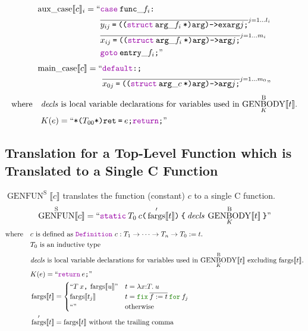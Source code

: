 \documentclass[a4paper,fleqn]{article}
\newcommand{\kwDefinition}{\mbox{\color{myviolet}\ttfamily Definition}}
\newcommand{\kwfix}{\mbox{\color{mygreen}\ttfamily fix}}
\newcommand{\kwfor}{\mbox{\color{mygreen}\ttfamily for}}
\newcommand{\lamT}[3]{\lambda #1\mathord{:}#2.\:#3}
\newcommand{\ofix}[2]{\kwfix\:{#1}\:\kwfor\:{#2}}
\newcommand{\BRA}[1]{\llbracket #1 \rrbracket}
\DeclareMathOperator{\genbody}{GENBODY}
\newcommand{\genbodyb}[2]{\genbody^\mathrm{B}_{#1}\BRA{#2}}
\DeclareMathOperator{\genfunop}{GENFUN}
\newcommand{\genfuns}[1]{\genfunop^\mathrm{S}\BRA{#1}}
\newcommand{\auxcase}[2]{\mathrm{aux\_case}\BRA{#1}_{#2}}
\newcommand{\maincase}[1]{\mathrm{main\_case}\BRA{#1}}
\newcommand{\ldq}{\text{``}}
\newcommand{\rdq}{\text{''}}
\newcommand{\dq}[1]{\text{``}#1\text{''}}
\newcommand{\ttparen}[1]{\texttt{(}#1\texttt{)}}
\newcommand{\ttlbrace}{\texttt{\char '173}}
\newcommand{\ttrbrace}{\texttt{\char '175}}
\newcommand{\ttbrace}[1]{\ttlbrace#1\ttrbrace}
\newcommand{\tteq}{\texttt{=}}
\newcommand{\ttsemi}{\texttt{;}}
\newcommand{\ttcomma}{\texttt{,}}
\newcommand{\ttcolon}{\texttt{:}}
\newcommand{\ttstar}{\texttt{*}}
\newcommand{\kwgoto}{\mbox{\color{myviolet}\ttfamily goto}}
\newcommand{\kwstruct}{\mbox{\color{myviolet}\ttfamily struct}}
\newcommand{\kwCreturn}{\mbox{\color{myviolet}\ttfamily return}}
\newcommand{\kwcase}{\mbox{\color{myviolet}\ttfamily case}}
\newcommand{\kwdefault}{\mbox{\color{myviolet}\ttfamily default}}
\newcommand{\kwstatic}{\mbox{\color{myviolet}\ttfamily static}}
\DeclareMathOperator{\fargsop}{fargs}
\newcommand{\fargs}[1]{\fargsop\BRA{#1}}
\newcommand{\fargsd}[1]{\fargsop'\BRA{#1}}
\newcommand{\rep}[1]{\overline{#1}}
\newcommand{\repi}[2]{\overline{#1}^{#2}}
\begin{document}
\begin{align*}
  \auxcase{c}{i} = \ldq & \kwcase\:\mathtt{func\_}f_i\ttcolon \\
  & \repi{y_{ij}\:\tteq\:\ttparen{\ttparen{\kwstruct\:\mathtt{arg\_}f_i\:\ttstar}\mathtt{arg}}\texttt{->}\mathtt{exarg}j\ttsemi}{j=1\ldots l_i} \\
  & \repi{x_{ij}\:\tteq\:\ttparen{\ttparen{\kwstruct\:\mathtt{arg\_}f_i\:\ttstar}\mathtt{arg}}\texttt{->}\mathtt{arg}j\ttsemi}{j=1\ldots m_i} \\
  & \kwgoto\:\mathtt{entry\_}f_i\ttsemi \rdq
\end{align*}
\begin{align*}
  \maincase{c} = \ldq & \kwdefault\ttcolon\ttsemi \\
  & \repi{x_{0j}\:\tteq\:\ttparen{\ttparen{\kwstruct\:\mathtt{arg\_}c\:\ttstar}\mathtt{arg}}\texttt{->}\mathtt{arg}j\ttsemi}{j=1\ldots m_0} \rdq
\end{align*}
\[ \text{where} \quad
  \begin{aligned}[t]
    & \text{$\mathit{decls}$ is local variable declarations for variables used in $\genbodyb{K}{t}$.} \\
    & K(e) = \dq{\ttstar\ttparen{T_{00}\ttstar}\texttt{ret}\:\tteq\:e\ttsemi \kwCreturn\ttsemi}
  \end{aligned}
\]

\subsection{Translation for a Top-Level Function which is Translated to a Single C Function}\label{sec:genfuns}
$\genfuns{c}$ translates the function (constant) $c$ to a single C function.
\[
  \genfuns{c} = \dq{\kwstatic\:T_0\:c\ttparen{\fargsd{t}}\:\ttbrace{\:\mathit{decls}\:\genbodyb{K}{t}\:}}
\]
\[ \text{where} \quad
  \begin{aligned}[t]
    & \text{$c$ is defined as \kwDefinition~$c : T_1 \rightarrow \dotsb \rightarrow T_n \rightarrow T_0 := t.$} \\
    & \text{$T_0$ is an inductive type} \\
    & \text{$\mathit{decls}$ is local variable declarations for variables used in $\genbodyb{K}{t}$ excluding $\fargs{t}$.} \\
    & K(e) = \dq{\kwCreturn\:e\ttsemi} \\
    & \fargs{t} =
      \begin{cases}
        \dq{T\:x\ttcomma\:\fargs{u}}      & t = \lamT{x}{T}{u} \\
        \fargs{t_j}       & t = \ofix{\rep{f:=t}}{f_j} \\
        \dq{}    & \text{otherwise}
      \end{cases} \\
    & \fargsd{t} = \fargs{t}~\text{without the trailing comma}
  \end{aligned}
\]
\end{document}
